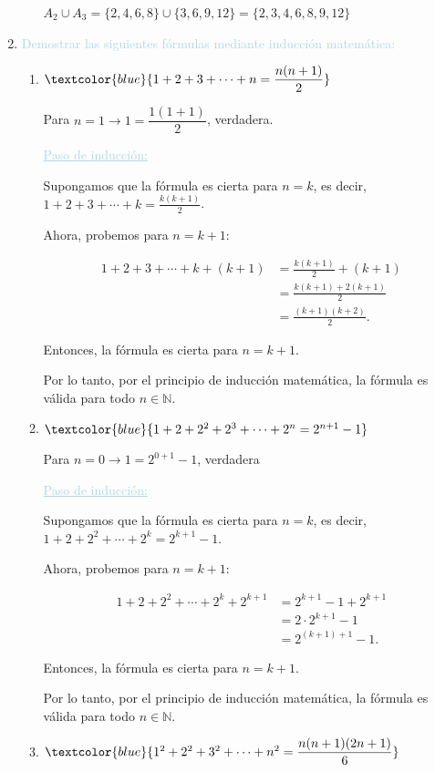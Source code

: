 \documentclass{article}
\newcommand{\bu}[1]{\textcolor{lightblue}{\underline{#1}}}
\newcommand{\lb}[1]{\textcolor{lightblue}{#1}}
\newcommand{\db}[1]{\textcolor{blue}{#1}}
\begin{document}
\begin{enumerate}[label=\color{red}\textbf{\arabic*)},leftmargin=*]
\begin{itemize}[label=$-$]
      	$A_2\cup A_3=\{2,4,6,8\}\cup\{3,6,9,12\}=\{2,3,4,6,8,9,12\}$
      \end{itemize}
      \item \lb{Demostrar las siguientes fórmulas mediante inducción matemática:}
      \begin{enumerate}[label=\color{red}\alph*)]
      	\item $\db{1+2+3+\cdots+n=\dfrac{n(n+1)}{2}}$
      	
      	Para $n=1\longrightarrow 1=\dfrac{1(1+1)}{2}$, verdadera.
      	
      	\bu{Paso de inducción:}
      	
      	Supongamos que la fórmula es cierta para \(n = k\), es decir, \(1+2+3+\cdots+k = \frac{k(k+1)}{2}\).
      	
      	Ahora, probemos para \(n = k + 1\):
      	
      	
      	\begin{align*}
      		1+2+3+\cdots+k+(k+1) &= \frac{k(k+1)}{2} + (k+1) \\
      		&= \frac{k(k+1) + 2(k+1)}{2} \\
      		&= \frac{(k+1)(k+2)}{2}.
      	\end{align*}
      	
      	
      	Entonces, la fórmula es cierta para \(n = k + 1\).
      	
      	Por lo tanto, por el principio de inducción matemática, la fórmula es válida para todo \(n \in \mathbb{N}\).
      	\item $\db{1+2+2^2+2^3+\cdots+2^n=2^{n+1}-1}$
      	
      	Para $n=0\longrightarrow 1=2^{0+1}-1$, verdadera
      	
      	\bu{Paso de inducción:}
      	
      Supongamos que la fórmula es cierta para \(n = k\), es decir, \(1+2+2^2+\cdots+2^k = 2^{k+1} - 1\).
      
      Ahora, probemos para \(n = k + 1\):
      
      
      \begin{align*}
      	1+2+2^2+\cdots+2^k+2^{k+1} &= 2^{k+1} - 1 + 2^{k+1} \\
      	&= 2 \cdot 2^{k+1} - 1 \\
      	&= 2^{(k+1)+1} - 1.
      \end{align*}
      
      
      Entonces, la fórmula es cierta para \(n = k + 1\).
      
      Por lo tanto, por el principio de inducción matemática, la fórmula es válida para todo \(n \in \mathbb{N}\).
      	\item $\db{1^2+2^2+3^2+\cdots+n^2=\dfrac{n(n+1)(2n+1)}{6}}$
      	

\end{enumerate}
\end{enumerate}
\end{document}
